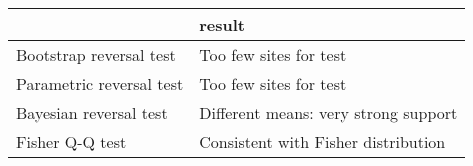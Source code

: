 \begin{tabular}{ll}
\toprule
{} &                                result \\
\midrule
Bootstrap reversal test  &                Too few sites for test \\
Parametric reversal test &                Too few sites for test \\
Bayesian reversal test   &  Different means: very strong support \\
Fisher Q-Q test          &   Consistent with Fisher distribution \\
\bottomrule
\end{tabular}
